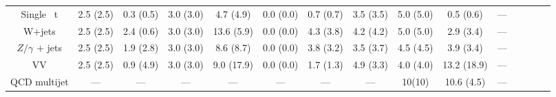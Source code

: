 \begin{table}
\begin{adjustbox}{max width=\textwidth}
\begin{tabular}{  c c c c c c c c c c c c c cc}
Single ~t & 2.5 (2.5) &  0.3 (0.5) &  3.0 (3.0) & 4.7 (4.9) &  0.0 (0.0) &  0.7 (0.7) &  3.5 (3.5) &  5.0 (5.0) & 0.5 (0.6) & --- \\ 
W+jets & 2.5 (2.5) &  2.4 (0.6) &  3.0 (3.0) & 13.6 (5.9) &  0.0 (0.0) &  4.3 (3.8) &  4.2 (4.2) &  5.0 (5.0) & 2.9 (3.4) & --- \\ 
$Z/\gamma$ + jets & 2.5 (2.5) &  1.9 (2.8) &  3.0 (3.0) & 8.6 (8.7) &  0.0 (0.0) &  3.8 (3.2) &  3.5 (3.7) &  4.5 (4.5) & 3.9 (3.4) & --- \\ 
VV & 2.5 (2.5) &  0.9 (4.9) &  3.0 (3.0) & 9.0 (17.9) &  0.0 (0.0) &  1.7 (1.3) &  4.9 (3.3) &  4.0 (4.0) & 13.2 (18.9) & --- \\ 
QCD multijet & --- &  --- &  --- & --- &  --- &  --- &  --- &  10(10) & 10.6 (4.5) & --- \\ 
\hline 
\end{tabular}
\end{adjustbox}
\end{table}
    
